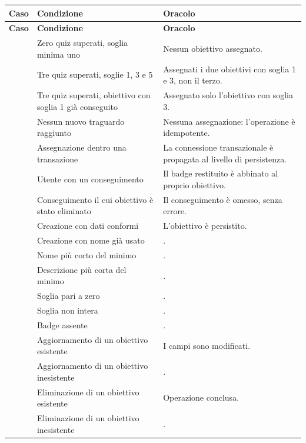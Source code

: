 \begin{longtable}{@{}l L{5.0cm} L{7.4cm}@{}}
\toprule
\textbf{Caso} & \textbf{Condizione} & \textbf{Oracolo} \\
\midrule
\endfirsthead
\toprule
\textbf{Caso} & \textbf{Condizione} & \textbf{Oracolo} \\
\midrule
\endhead
\bottomrule
\endlastfoot

 & Zero quiz superati, soglia minima uno &
Nessun obiettivo assegnato. \\

 & Tre quiz superati, soglie 1, 3 e 5 &
Assegnati i due obiettivi con soglia 1 e 3, non il terzo. \\

 & Tre quiz superati, obiettivo con soglia 1 già conseguito &
Assegnato solo l'obiettivo con soglia 3. \\

 & Nessun nuovo traguardo raggiunto &
Nessuna assegnazione: l'operazione è idempotente. \\

 & Assegnazione dentro una transazione &
La connessione transazionale è propagata al livello di persistenza. \\

 & Utente con un conseguimento &
Il badge restituito è abbinato al proprio obiettivo. \\

 & Conseguimento il cui obiettivo è stato eliminato &
Il conseguimento è omesso, senza errore. \\

 & Creazione con dati conformi & L'obiettivo è persistito. \\
 & Creazione con nome già usato & . \\
 & Nome più corto del minimo & . \\
 & Descrizione più corta del minimo & . \\
 & Soglia pari a zero & . \\
 & Soglia non intera & . \\
 & Badge assente & . \\
 & Aggiornamento di un obiettivo esistente & I campi sono modificati. \\
 & Aggiornamento di un obiettivo inesistente & . \\
 & Eliminazione di un obiettivo esistente & Operazione conclusa. \\
 & Eliminazione di un obiettivo inesistente & . \\

\end{longtable}

